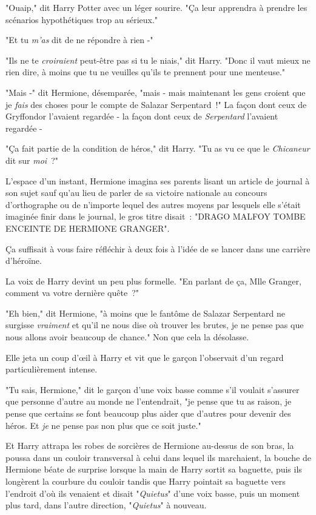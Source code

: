 "Ouaip," dit Harry Potter avec un léger sourire. "Ça leur apprendra à prendre les scénarios hypothétiques trop au sérieux."

"Et tu \emph{m'as} dit de ne répondre à rien -"

"Ils ne te \emph{croiraient} peut-être pas si tu le niais," dit Harry. "Donc il vaut mieux ne rien dire, à moins que tu ne veuilles qu'ils te prennent pour une menteuse."

"Mais -" dit Hermione, désemparée, "mais - mais maintenant les gens croient que je \emph{fais} des choses pour le compte de Salazar Serpentard~!" La façon dont ceux de Gryffondor l'avaient regardée - la façon dont ceux de \emph{Serpentard} l'avaient regardée -

"Ça fait partie de la condition de héros," dit Harry. "Tu as vu ce que le \emph{Chicaneur} dit sur \emph{moi}~?"

L'espace d'un instant, Hermione imagina ses parents lisant un article de journal à son sujet sauf qu'au lieu de parler de sa victoire nationale au concours d'orthographe ou de n'importe lequel des autres moyens par lesquels elle s'était imaginée finir dans le journal, le gros titre disait~: "DRAGO MALFOY TOMBE ENCEINTE DE HERMIONE GRANGER".

Ça suffisait à vous faire réfléchir à deux fois à l'idée de se lancer dans une carrière d'héroïne.

La voix de Harry devint un peu plus formelle. "En parlant de ça, Mlle Granger, comment va votre dernière quête~?"

"Eh bien," dit Hermione, "à moins que le fantôme de Salazar Serpentard ne surgisse \emph{vraiment} et qu'il ne nous dise où trouver les brutes, je ne pense pas que nous allons avoir beaucoup de chance." Non que cela la désolasse.

Elle jeta un coup d'œil à Harry et vit que le garçon l'observait d'un regard particulièrement intense.

"Tu sais, Hermione," dit le garçon d'une voix basse comme s'il voulait s'assurer que personne d'autre au monde ne l'entendrait, "je pense que tu as raison, je pense que certains se font beaucoup plus aider que d'autres pour devenir des héros. Et \emph{je} ne pense pas non plus que ce soit juste."

Et Harry attrapa les robes de sorcières de Hermione au-dessus de son bras, la poussa dans un couloir transversal à celui dans lequel ils marchaient, la bouche de Hermione béate de surprise lorsque la main de Harry sortit sa baguette, puis ils longèrent la courbure du couloir tandis que Harry pointait sa baguette vers l'endroit d'où ils venaient et disait "\emph{Quietus}" d'une voix basse, puis un moment plus tard, dans l'autre direction, "\emph{Quietus}" à nouveau.

